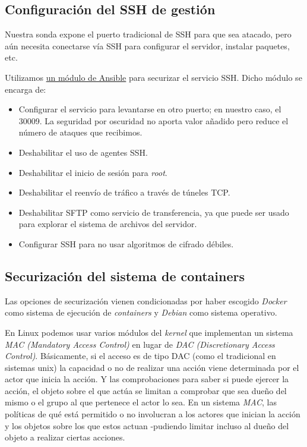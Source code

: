 \subsection{Configuración del SSH de gestión}

Nuestra sonda expone el puerto tradicional de SSH para que sea atacado, pero aún necesita conectarse vía SSH para configurar el servidor,
instalar paquetes, etc.

Utilizamos \href{https://github.com/dev-sec/ansible-ssh-hardening}{un módulo de Ansible} para securizar el servicio SSH. 
Dicho módulo se encarga de:

\begin{itemize}
    \item Configurar el servicio para levantarse en otro puerto; en nuestro caso, el 30009. 
    La seguridad por oscuridad no aporta valor añadido pero reduce el número de ataques que recibimos. 
    \item Deshabilitar el uso de agentes SSH.
    \item Deshabilitar el inicio de sesión para \emph{root}.
    \item Deshabilitar el reenvío de tráfico a través de túneles TCP.
    \item Deshabilitar SFTP como servicio de transferencia, ya que puede ser usado para explorar el sistema de archivos del servidor.
    \item Configurar SSH para no usar algoritmos de cifrado débiles. 
\end{itemize}

\subsection{Securización del sistema de containers}

Las opciones de securización vienen condicionadas por haber escogido \emph{Docker} como sistema de ejecución de \emph{containers}
y \emph{Debian} como sistema operativo. 

En Linux podemos usar varios módulos del \emph{kernel} que implementan un sistema \emph{MAC (Mandatory Access Control)} en lugar de \emph{DAC (Discretionary Access Control)}. 
Básicamente, si el acceso es de tipo DAC (como el tradicional en sistemas unix) la capacidad o no de realizar una acción viene determinada por el actor que inicia la acción. Y las comprobaciones
para saber si puede ejercer la acción, el objeto sobre el que actúa se limitan a comprobar que sea dueño del mismo o el grupo al que pertenece el actor lo sea.
En un sistema \emph{MAC}, las políticas de qué está permitido o no involucran a los actores que inician la acción y los objetos sobre los que estos actuan -pudiendo limitar incluso al dueño del objeto a realizar ciertas acciones.

